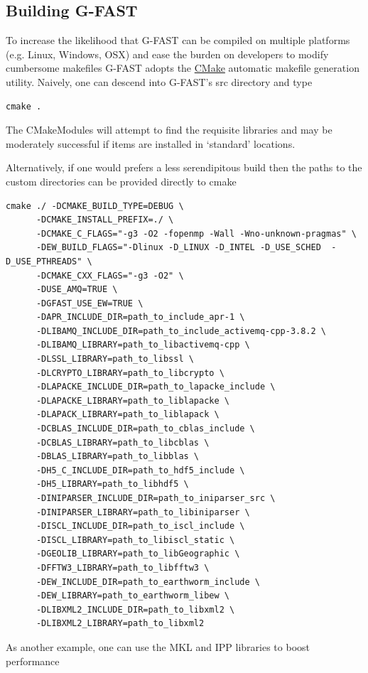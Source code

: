 \documentclass[12pt]{article}
\begin{document}
\subsection{Building G-FAST}

To increase the likelihood that G-FAST can be compiled on multiple platforms (e.g. Linux, 
Windows, OSX) and ease the burden on developers to modify cumbersome makefiles G-FAST 
adopts the \href{https://cmake.org/}{CMake} automatic makefile generation utility.  
Naively, one can descend into G-FAST's src directory and type 
\begin{verbatim}
cmake .
\end{verbatim}  
The CMakeModules will attempt to find the requisite libraries and may be moderately successful
if items are installed in `standard' locations.  

Alternatively, if one would prefers a less serendipitous build then the paths to the custom
directories can be provided directly to cmake  
\begin{verbatim}
cmake ./ -DCMAKE_BUILD_TYPE=DEBUG \
      -DCMAKE_INSTALL_PREFIX=./ \
      -DCMAKE_C_FLAGS="-g3 -O2 -fopenmp -Wall -Wno-unknown-pragmas" \
      -DEW_BUILD_FLAGS="-Dlinux -D_LINUX -D_INTEL -D_USE_SCHED  -D_USE_PTHREADS" \
      -DCMAKE_CXX_FLAGS="-g3 -O2" \
      -DUSE_AMQ=TRUE \
      -DGFAST_USE_EW=TRUE \      
      -DAPR_INCLUDE_DIR=path_to_include_apr-1 \
      -DLIBAMQ_INCLUDE_DIR=path_to_include_activemq-cpp-3.8.2 \
      -DLIBAMQ_LIBRARY=path_to_libactivemq-cpp \
      -DLSSL_LIBRARY=path_to_libssl \
      -DLCRYPTO_LIBRARY=path_to_libcrypto \
      -DLAPACKE_INCLUDE_DIR=path_to_lapacke_include \
      -DLAPACKE_LIBRARY=path_to_liblapacke \
      -DLAPACK_LIBRARY=path_to_liblapack \
      -DCBLAS_INCLUDE_DIR=path_to_cblas_include \
      -DCBLAS_LIBRARY=path_to_libcblas \
      -DBLAS_LIBRARY=path_to_libblas \
      -DH5_C_INCLUDE_DIR=path_to_hdf5_include \
      -DH5_LIBRARY=path_to_libhdf5 \
      -DINIPARSER_INCLUDE_DIR=path_to_iniparser_src \
      -DINIPARSER_LIBRARY=path_to_libiniparser \
      -DISCL_INCLUDE_DIR=path_to_iscl_include \
      -DISCL_LIBRARY=path_to_libiscl_static \
      -DGEOLIB_LIBRARY=path_to_libGeographic \
      -DFFTW3_LIBRARY=path_to_libfftw3 \
      -DEW_INCLUDE_DIR=path_to_earthworm_include \
      -DEW_LIBRARY=path_to_earthworm_libew \
      -DLIBXML2_INCLUDE_DIR=path_to_libxml2 \
      -DLIBXML2_LIBRARY=path_to_libxml2
\end{verbatim}
As another example, one can use the MKL and IPP libraries to boost performance 
\end{document}
